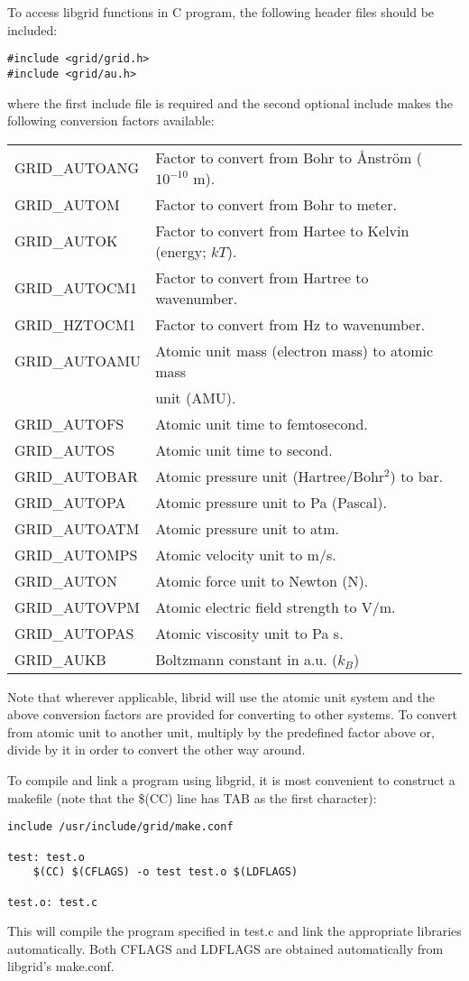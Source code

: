 \documentclass[12pt,letterpaper]{report}
\begin{document}
To access libgrid functions in C program, the following header files should be included:
\begin{verbatim}
#include <grid/grid.h>
#include <grid/au.h>
\end{verbatim}
where the first include file is required and the second optional include makes the following conversion factors available:\\

\begin{longtable}{ll}
GRID\_AUTOANG & Factor to convert from Bohr to \AA{}nstr\"om ($10^{-10}$ m).\\
GRID\_AUTOM & Factor to convert from Bohr to meter.\\
GRID\_AUTOK & Factor to convert from Hartee to Kelvin (energy; $kT$).\\
GRID\_AUTOCM1 & Factor to convert from Hartree to wavenumber.\\
GRID\_HZTOCM1 & Factor to convert from Hz to wavenumber.\\
GRID\_AUTOAMU & Atomic unit mass (electron mass) to atomic mass\\
              & unit (AMU).\\
GRID\_AUTOFS & Atomic unit time to femtosecond.\\
GRID\_AUTOS  & Atomic unit time to second.\\
GRID\_AUTOBAR & Atomic pressure unit (Hartree/Bohr$^2$) to bar.\\
GRID\_AUTOPA & Atomic pressure unit to Pa (Pascal).\\
GRID\_AUTOATM & Atomic pressure unit to atm.\\
GRID\_AUTOMPS & Atomic velocity unit to m/s.\\
GRID\_AUTON & Atomic force unit to Newton (N).\\
GRID\_AUTOVPM & Atomic electric field strength to V/m.\\
GRID\_AUTOPAS & Atomic viscosity unit to Pa s.\\
GRID\_AUKB & Boltzmann constant in a.u. ($k_B$)\\ 
\end{longtable}
\noindent
Note that wherever applicable, librid will use the atomic unit system and the above conversion factors are provided for converting to other systems. To convert from atomic unit to another unit, multiply by the predefined factor above or, divide by it in order to convert the other way around.

To compile and link a program using libgrid, it is most convenient to construct a makefile (note that the \$(CC) line has TAB as the first character):
\begin{verbatim}
include /usr/include/grid/make.conf

test: test.o
    $(CC) $(CFLAGS) -o test test.o $(LDFLAGS)

test.o: test.c
\end{verbatim}
This will compile the program specified in test.c and link the appropriate libraries automatically. Both CFLAGS and LDFLAGS are obtained automatically from libgrid's make.conf. 
\end{document}
